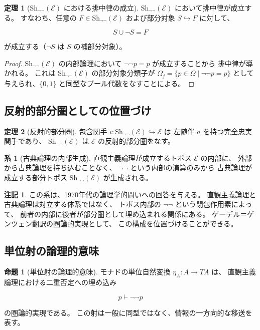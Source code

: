 \documentclass[11pt,a4paper]{article}
\theoremstyle{definition}
\newtheorem{theorem}{定理}[section]
\newtheorem{corollary}{系}[section]
\newtheorem{proposition}{命題}[section]
\newtheorem{remark}{注記}[section]
\newcommand{\Sh}{\mathrm{Sh}_{\neg\neg}}
\newcommand{\topos}{\mathcal{E}}
\begin{document}
\begin{theorem}[\texorpdfstring{$\Sh(\topos)$}{Sh(E)} における排中律の成立]
$\Sh(\topos)$ において排中律が成立する。
すなわち、任意の $F \in \Sh(\topos)$ および部分対象 $S \hookrightarrow F$ に対して、

\[
S \cup \neg S = F
\]

が成立する（$\neg S$ は $S$ の補部分対象）。
\end{theorem}

\begin{proof}
$\Sh(\topos)$ の内部論理において $\neg\neg p = p$ が成立することから
排中律が導かれる。
これは $\Sh(\topos)$ の部分対象分類子が
$\Omega_j = \{p \in \Omega \mid \neg\neg p = p\}$
として与えられ、$\{0,1\}$ と同型なブール代数をなすことによる。
\end{proof}

\subsection{反射的部分圏としての位置づけ}

\begin{theorem}[反射的部分圏]
包含関手 $i: \Sh(\topos) \hookrightarrow \topos$ は
左随伴 $a$ を持つ完全忠実関手であり、
$\Sh(\topos)$ は $\topos$ の反射的部分圏をなす。
\end{theorem}

\begin{corollary}[古典論理の内部生成]
直観主義論理が成立するトポス $\topos$ の内部に、
外部から古典論理を持ち込むことなく、
$\neg\neg$ という内部の演算のみから
古典論理が成立する部分トポス $\Sh(\topos)$ が生成される。
\end{corollary}

\begin{remark}
この系は、1970年代の論理学的問いへの回答を与える。
直観主義論理と古典論理は対立する体系ではなく、
トポス内部の $\neg\neg$ という閉包作用素によって、
前者の内部に後者が部分圏として埋め込まれる関係にある。
ゲーデル＝ゲンツェン翻訳の圏論的実現として、
この構成を位置づけることができる。
\end{remark}

\subsection{単位射の論理的意味}

\begin{proposition}[単位射の論理的意味]
モナドの単位自然変換 $\eta_A: A \to TA$ は、
直観主義論理における二重否定への埋め込み

\[
p \vdash \neg\neg p
\]

の圏論的実現である。
この射は一般に同型ではなく、情報の一方向的な移送を表す。
\end{proposition}
\end{document}
